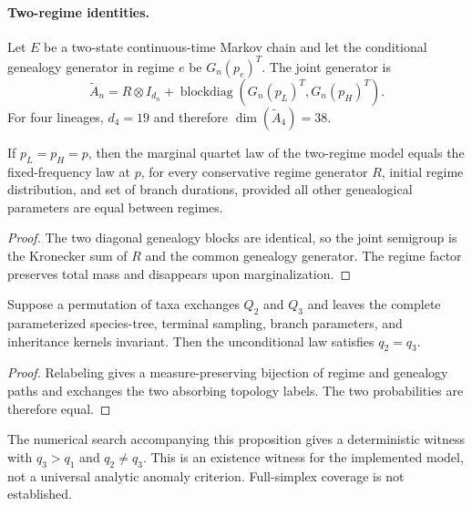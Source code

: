 \paragraph{Two-regime identities.}
Let $E$ be a two-state continuous-time Markov chain and let the conditional
genealogy generator in regime $e$ be $G_n(p_e)^T$. The joint generator is
\[
 \widetilde A_n=R\otimes I_{d_n}+\operatorname{blockdiag}
 (G_n(p_L)^T,G_n(p_H)^T).
\]
For four lineages, $d_4=19$ and therefore
$\dim(\widetilde A_4)=38$.

\begin{proposition}
If $p_L=p_H=p$, then the marginal quartet law of the two-regime model equals
the fixed-frequency law at $p$, for every conservative regime generator $R$,
initial regime distribution, and set of branch durations, provided all other
genealogical parameters are equal between regimes.
\end{proposition}
\begin{proof}
The two diagonal genealogy blocks are identical, so the joint semigroup is the
Kronecker sum of $R$ and the common genealogy generator. The regime factor
preserves total mass and disappears upon marginalization.
\end{proof}

\begin{proposition}
Suppose a permutation of taxa exchanges $Q_2$ and $Q_3$ and leaves the complete
parameterized species-tree, terminal sampling, branch parameters, and
inheritance kernels invariant. Then the unconditional law satisfies
$q_2=q_3$.
\end{proposition}
\begin{proof}
Relabeling gives a measure-preserving bijection of regime and genealogy paths
and exchanges the two absorbing topology labels. The two probabilities are
therefore equal.
\end{proof}

The numerical search accompanying this proposition gives a deterministic
witness with $q_3>q_1$ and $q_2\ne q_3$. This is an existence witness for the
implemented model, not a universal analytic anomaly criterion. Full-simplex
coverage is not established.
